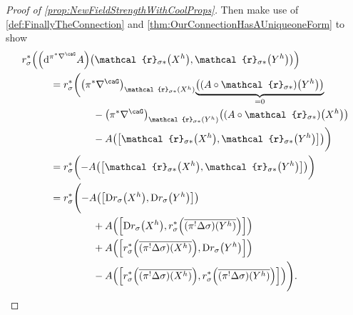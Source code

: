 \documentclass[reqno,a4paper,oneside]{amsart}
\theoremstyle{plain}
\theoremstyle{remark}
\theoremstyle{definition}
\begin{document}
\begin{proof}[Proof of \ref{prop:NewFieldStrengthWithCoolProps}]
Then make use of \ref{def:FinallyTheConnection} and \ref{thm:OurConnectionHasAUniqueoneForm} to show
\begin{align}\label{TransformedClassicStrengthTerm}
&
r_\sigma^*\mleft(
\mleft(\mathrm{d}^{\pi^*\nabla^\caG} A\mright) \mleft(\mathcal{r}_{\sigma*}\mleft(X^h\mright), \mathcal{r}_{\sigma*}\mleft(Y^h\mright)\mright)
\mright)
\nonumber
\\
&\hspace{1cm}=
r_\sigma^*\biggl(
\mleft( \pi^*\nabla^\caG \mright)_{\mathcal{r}_{\sigma*}\mleft(X^h\mright)} {\underbrace{\mleft( (A \circ \mathcal{r}_{\sigma*})\mleft(Y^h\mright) \mright)}_{= 0}}
\nonumber
\\
&\hspace{2.5cm}
	- \mleft( \pi^*\nabla^\caG \mright)_{\mathcal{r}_{\sigma*}\mleft(Y^h\mright)} \mleft( (A \circ \mathcal{r}_{\sigma*})\mleft(X^h\mright) \mright)
\nonumber
\\
&\hspace{2.5cm}
	- A\mleft( \mleft[ \mathcal{r}_{\sigma*}\mleft(X^h\mright), \mathcal{r}_{\sigma*}\mleft(Y^h\mright) \mright] \mright)
\biggr)
\nonumber
\\
&\hspace{1cm}=r_\sigma^*\biggl(
	- A\mleft( \mleft[ \mathcal{r}_{\sigma*}\mleft(X^h\mright), \mathcal{r}_{\sigma*}\mleft(Y^h\mright) \mright] \mright)
\biggr)
\nonumber
\\
&\hspace{1cm}=r_\sigma^*\Biggl(
- A\mleft(
	\mleft[\mathrm{D}r_\sigma\mleft( X^h \mright), \mathrm{D}r_\sigma\mleft(Y^h\mright)\mright]
\mright)
\nonumber
\\
&\hspace{2.5cm}
	+ A\mleft(
	\mleft[\mathrm{D}r_\sigma\mleft(X^h\mright), r_{\sigma}^*\mleft({\overline{ \mleft(\pi^! \Delta \sigma \mright) \mleft(Y^h\mright) }}\mright) \mright]
	\mright)
\nonumber
\\
&\hspace{2.5cm}
	+ A\mleft(
	\mleft[r_{\sigma}^*\mleft({\overline{ \mleft(\pi^! \Delta \sigma \mright) \mleft(X^h\mright) }}\mright), \mathrm{D}r_\sigma\mleft(Y^h\mright) \mright]
	\mright)
\nonumber
\\
&\hspace{2.5cm}
	- A\mleft(
	\mleft[r_{\sigma}^*\mleft({\overline{ \mleft(\pi^! \Delta \sigma \mright) \mleft(X^h \mright) }}\mright), r_{\sigma}^*\mleft({\overline{ \mleft(\pi^! \Delta \sigma \mright)\mleft(Y^h \mright) }}\mright) \mright]
	\mright)
\Biggr).
\end{align}

\end{proof}
\end{document}
